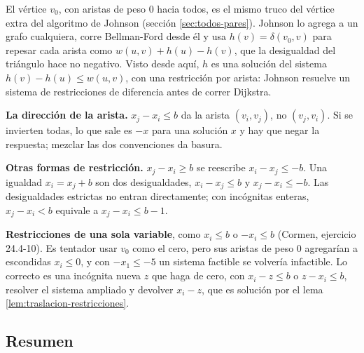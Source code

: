 \documentclass[11pt,letterpaper]{article}
\begin{document}
\begin{observacion}
  El vértice $v_0$, con aristas de peso $0$ hacia todos, es el mismo
  truco del vértice extra del algoritmo de Johnson (sección
  \ref{sec:todos-pares}). Johnson lo agrega a un grafo cualquiera,
  corre Bellman-Ford desde él y usa $h(v) = \delta(v_0, v)$ para
  repesar cada arista como $w(u, v) + h(u) - h(v)$, que la desigualdad
  del triángulo hace no negativo. Visto desde aquí, $h$ es una
  solución del sistema $h(v) - h(u) \le w(u, v)$, con una restricción
  por arista: Johnson resuelve un sistema de restricciones de
  diferencia antes de correr Dijkstra.
\end{observacion}

\begin{ojo}
  \textbf{La dirección de la arista.} $x_j - x_i \le b$ da la arista
  $(v_i, v_j)$, no $(v_j, v_i)$. Si se invierten todas, lo que sale es
  $-x$ para una solución $x$ y hay que negar la respuesta; mezclar las
  dos convenciones da basura.

  \smallskip
  \textbf{Otras formas de restricción.} $x_j - x_i \ge b$ se reescribe
  $x_i - x_j \le -b$. Una igualdad $x_i = x_j + b$ son dos
  desigualdades, $x_i - x_j \le b$ y $x_j - x_i \le -b$. Las
  desigualdades estrictas no entran directamente; con incógnitas
  enteras, $x_j - x_i < b$ equivale a $x_j - x_i \le b - 1$.

  \smallskip
  \textbf{Restricciones de una sola variable}, como $x_i \le b$ o
  $-x_i \le b$ (Cormen, ejercicio 24.4-10). Es tentador usar $v_0$
  como el cero, pero sus aristas de peso $0$ agregarían a escondidas
  $x_i \le 0$, y con $-x_1 \le -5$ un sistema factible se volvería
  infactible. Lo correcto es una incógnita nueva $z$ que haga de cero,
  con $x_i - z \le b$ o $z - x_i \le b$, resolver el sistema ampliado
  y devolver $x_i - z$, que es solución por el lema
  \ref{lem:traslacion-restricciones}.
\end{ojo}


\subsection*{Resumen}
\end{document}
